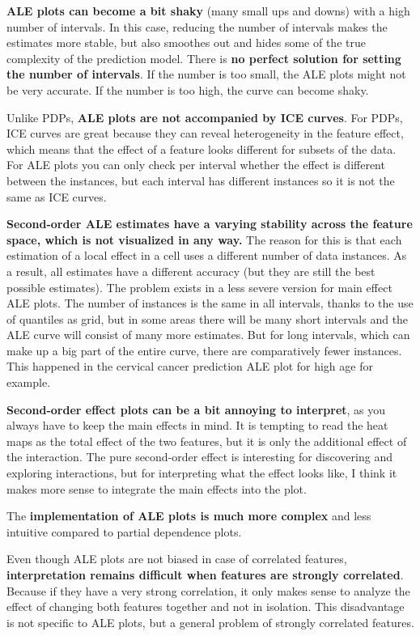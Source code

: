 \documentclass[12pt,]{krantz}
\begin{document}
\textbf{ALE plots can become a bit shaky} (many small ups and downs)
with a high number of intervals. In this case, reducing the number of
intervals makes the estimates more stable, but also smoothes out and
hides some of the true complexity of the prediction model. There is
\textbf{no perfect solution for setting the number of intervals}. If the
number is too small, the ALE plots might not be very accurate. If the
number is too high, the curve can become shaky.

Unlike PDPs, \textbf{ALE plots are not accompanied by ICE curves}. For
PDPs, ICE curves are great because they can reveal heterogeneity in the
feature effect, which means that the effect of a feature looks different
for subsets of the data. For ALE plots you can only check per interval
whether the effect is different between the instances, but each interval
has different instances so it is not the same as ICE curves.

\textbf{Second-order ALE estimates have a varying stability across the
feature space, which is not visualized in any way.} The reason for this
is that each estimation of a local effect in a cell uses a different
number of data instances. As a result, all estimates have a different
accuracy (but they are still the best possible estimates). The problem
exists in a less severe version for main effect ALE plots. The number of
instances is the same in all intervals, thanks to the use of quantiles
as grid, but in some areas there will be many short intervals and the
ALE curve will consist of many more estimates. But for long intervals,
which can make up a big part of the entire curve, there are
comparatively fewer instances. This happened in the cervical cancer
prediction ALE plot for high age for example.

\textbf{Second-order effect plots can be a bit annoying to interpret},
as you always have to keep the main effects in mind. It is tempting to
read the heat maps as the total effect of the two features, but it is
only the additional effect of the interaction. The pure second-order
effect is interesting for discovering and exploring interactions, but
for interpreting what the effect looks like, I think it makes more sense
to integrate the main effects into the plot.

The \textbf{implementation of ALE plots is much more complex} and less
intuitive compared to partial dependence plots.

Even though ALE plots are not biased in case of correlated features,
\textbf{interpretation remains difficult when features are strongly
correlated}. Because if they have a very strong correlation, it only
makes sense to analyze the effect of changing both features together and
not in isolation. This disadvantage is not specific to ALE plots, but a
general problem of strongly correlated features.
\end{document}
